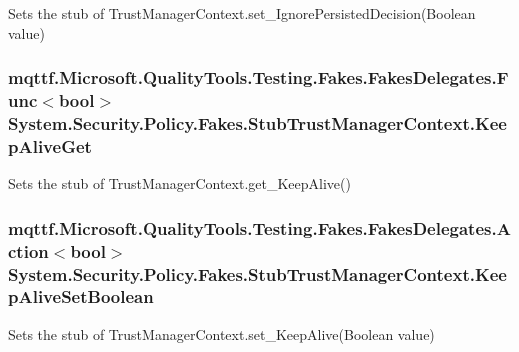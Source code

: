 Sets the stub of Trust\-Manager\-Context.\-set\-\_\-\-Ignore\-Persisted\-Decision(\-Boolean value)

\hypertarget{class_system_1_1_security_1_1_policy_1_1_fakes_1_1_stub_trust_manager_context_a386f37aab58db9a4929f05c15785c8da}{
\subsubsection[{Keep\-Alive\-Get}]{\setlength{\rightskip}{0pt plus 5cm}mqttf.\-Microsoft.\-Quality\-Tools.\-Testing.\-Fakes.\-Fakes\-Delegates.\-Func$<$bool$>$ System.\-Security.\-Policy.\-Fakes.\-Stub\-Trust\-Manager\-Context.\-Keep\-Alive\-Get}}\label{class_system_1_1_security_1_1_policy_1_1_fakes_1_1_stub_trust_manager_context_a386f37aab58db9a4929f05c15785c8da}


Sets the stub of Trust\-Manager\-Context.\-get\-\_\-\-Keep\-Alive()

\hypertarget{class_system_1_1_security_1_1_policy_1_1_fakes_1_1_stub_trust_manager_context_a701b8f72604ae5dbf078c958f85117a4}{
\subsubsection[{Keep\-Alive\-Set\-Boolean}]{\setlength{\rightskip}{0pt plus 5cm}mqttf.\-Microsoft.\-Quality\-Tools.\-Testing.\-Fakes.\-Fakes\-Delegates.\-Action$<$bool$>$ System.\-Security.\-Policy.\-Fakes.\-Stub\-Trust\-Manager\-Context.\-Keep\-Alive\-Set\-Boolean}}\label{class_system_1_1_security_1_1_policy_1_1_fakes_1_1_stub_trust_manager_context_a701b8f72604ae5dbf078c958f85117a4}


Sets the stub of Trust\-Manager\-Context.\-set\-\_\-\-Keep\-Alive(\-Boolean value)

